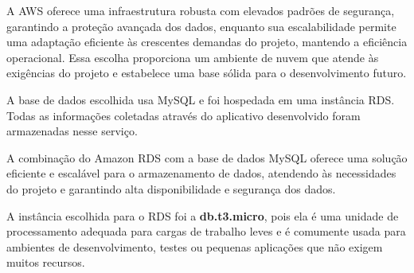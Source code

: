 A AWS oferece uma infraestrutura robusta com elevados padrões de segurança, garantindo a proteção avançada dos dados, enquanto sua escalabilidade permite uma adaptação eficiente às crescentes demandas do projeto, mantendo a eficiência operacional. Essa escolha proporciona um ambiente de nuvem que atende às exigências do projeto e estabelece uma base sólida para o desenvolvimento futuro.

A base de dados escolhida usa MySQL e foi hospedada em uma instância RDS. Todas as informações coletadas através do aplicativo desenvolvido foram armazenadas nesse serviço.


A combinação do Amazon RDS com a base de dados MySQL oferece uma solução eficiente e escalável para o armazenamento de dados, atendendo às necessidades do projeto e garantindo alta disponibilidade e segurança dos dados.









A instância escolhida para o RDS foi a \textbf{db.t3.micro}, pois ela é uma unidade de processamento adequada para cargas de trabalho leves e é comumente usada para ambientes de desenvolvimento, testes ou pequenas aplicações que não exigem muitos recursos.

